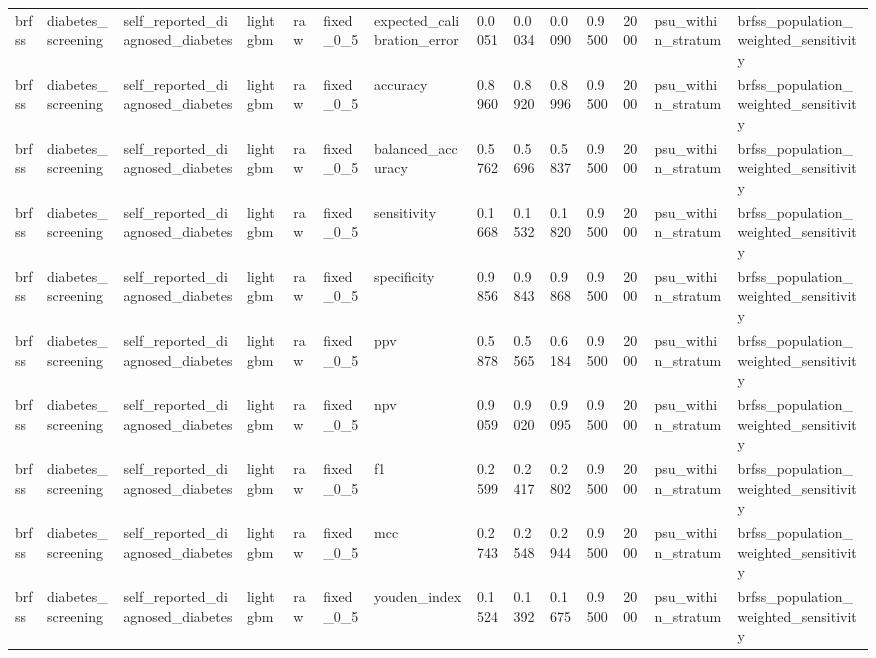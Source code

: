 \begin{tabular}{llllllllllllll}
brfss & diabetes\_screening & self\_reported\_diagnosed\_diabetes & lightgbm & raw & fixed\_0\_5 & expected\_calibration\_error & 0.0051 & 0.0034 & 0.0090 & 0.9500 & 2000 & psu\_within\_stratum & brfss\_population\_weighted\_sensitivity \\
brfss & diabetes\_screening & self\_reported\_diagnosed\_diabetes & lightgbm & raw & fixed\_0\_5 & accuracy & 0.8960 & 0.8920 & 0.8996 & 0.9500 & 2000 & psu\_within\_stratum & brfss\_population\_weighted\_sensitivity \\
brfss & diabetes\_screening & self\_reported\_diagnosed\_diabetes & lightgbm & raw & fixed\_0\_5 & balanced\_accuracy & 0.5762 & 0.5696 & 0.5837 & 0.9500 & 2000 & psu\_within\_stratum & brfss\_population\_weighted\_sensitivity \\
brfss & diabetes\_screening & self\_reported\_diagnosed\_diabetes & lightgbm & raw & fixed\_0\_5 & sensitivity & 0.1668 & 0.1532 & 0.1820 & 0.9500 & 2000 & psu\_within\_stratum & brfss\_population\_weighted\_sensitivity \\
brfss & diabetes\_screening & self\_reported\_diagnosed\_diabetes & lightgbm & raw & fixed\_0\_5 & specificity & 0.9856 & 0.9843 & 0.9868 & 0.9500 & 2000 & psu\_within\_stratum & brfss\_population\_weighted\_sensitivity \\
brfss & diabetes\_screening & self\_reported\_diagnosed\_diabetes & lightgbm & raw & fixed\_0\_5 & ppv & 0.5878 & 0.5565 & 0.6184 & 0.9500 & 2000 & psu\_within\_stratum & brfss\_population\_weighted\_sensitivity \\
brfss & diabetes\_screening & self\_reported\_diagnosed\_diabetes & lightgbm & raw & fixed\_0\_5 & npv & 0.9059 & 0.9020 & 0.9095 & 0.9500 & 2000 & psu\_within\_stratum & brfss\_population\_weighted\_sensitivity \\
brfss & diabetes\_screening & self\_reported\_diagnosed\_diabetes & lightgbm & raw & fixed\_0\_5 & f1 & 0.2599 & 0.2417 & 0.2802 & 0.9500 & 2000 & psu\_within\_stratum & brfss\_population\_weighted\_sensitivity \\
brfss & diabetes\_screening & self\_reported\_diagnosed\_diabetes & lightgbm & raw & fixed\_0\_5 & mcc & 0.2743 & 0.2548 & 0.2944 & 0.9500 & 2000 & psu\_within\_stratum & brfss\_population\_weighted\_sensitivity \\
brfss & diabetes\_screening & self\_reported\_diagnosed\_diabetes & lightgbm & raw & fixed\_0\_5 & youden\_index & 0.1524 & 0.1392 & 0.1675 & 0.9500 & 2000 & psu\_within\_stratum & brfss\_population\_weighted\_sensitivity \\

\end{tabular}
